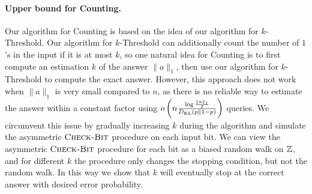 \paragraph{Upper bound for Counting.}
Our algorithm for Counting is based on the idea of our algorithm for $k$-Threshold.
Our algorithm for $k$-Threshold can additionally count the number of $1$'s in the input if it is at most $k$, so one natural idea for Counting is to first compute an estimation $k$ of the answer $\lVert a \rVert_1$, then use our algorithm for $k$-Threshold to compute the exact answer. However, this approach does not work when $\lVert a \rVert_1$ is very small compared to $n$, as there is no reliable way to estimate the answer within a constant factor using $o\left(n\frac{\log \frac{\lVert a\rVert_1}{\delta}}{D_{\operatorname{\mathrm{KL}}}(p \parallel 1-p)}\right)$ queries.
We circumvent this issue by gradually increasing $k$ during the algorithm and simulate the asymmetric $\textsc{Check-Bit}$ procedure on each input bit.
We can view the asymmetric $\textsc{Check-Bit}$ procedure for each bit as a biased random walk on $\mathbb{Z}$, and for different $k$ the procedure only changes the stopping condition, but not the random walk. In this way we show that $k$ will eventually stop at the correct answer with desired error probability.

